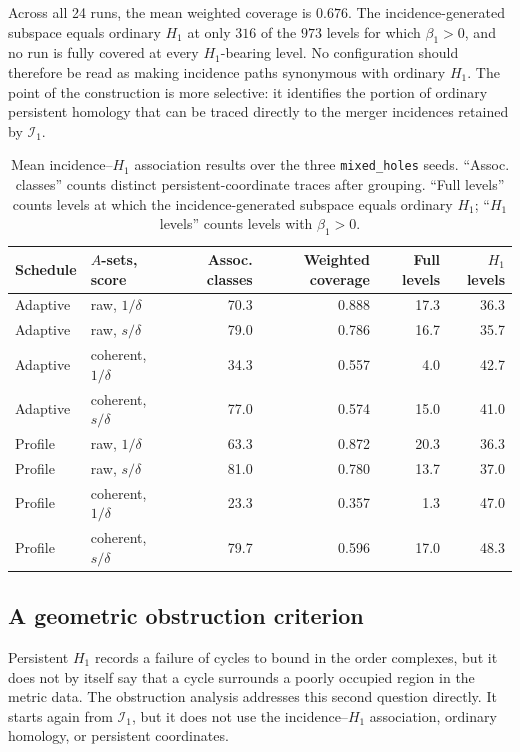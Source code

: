 \documentclass[a4paper,11pt]{article}
\theoremstyle{definition}
\theoremstyle{remark}
\begin{document}
Across all 24 runs, the mean weighted coverage is $0.676$. The incidence-generated subspace equals ordinary $H_1$ at only $316$ of the $973$ levels for which $\beta_1>0$, and no run is fully covered at every $H_1$-bearing level. No configuration should therefore be read as making incidence paths synonymous with ordinary $H_1$. The point of the construction is more selective: it identifies the portion of ordinary persistent homology that can be traced directly to the merger incidences retained by $\mathcal I_1$.

\begin{table}[!ht]
\centering
\caption{Mean incidence--$H_1$ association results over the three \texttt{mixed\_holes} seeds. ``Assoc. classes'' counts distinct persistent-coordinate traces after grouping.  ``Full levels'' counts levels at which the incidence-generated subspace equals ordinary $H_1$; ``$H_1$ levels'' counts levels with $\beta_1>0$.}
\label{tab:mixed-holes-h1-association}
\begin{tabular}{llrrrr}
\toprule
Schedule & $A$-sets, score & Assoc. classes & Weighted coverage & Full levels & $H_1$ levels\\
\midrule
Adaptive & raw, $1/\delta$ & 70.3 & 0.888 & 17.3 & 36.3\\
Adaptive & raw, $s/\delta$ & 79.0 & 0.786 & 16.7 & 35.7\\
Adaptive & coherent, $1/\delta$ & 34.3 & 0.557 & 4.0 & 42.7\\
Adaptive & coherent, $s/\delta$ & 77.0 & 0.574 & 15.0 & 41.0\\
Profile & raw, $1/\delta$ & 63.3 & 0.872 & 20.3 & 36.3\\
Profile & raw, $s/\delta$ & 81.0 & 0.780 & 13.7 & 37.0\\
Profile & coherent, $1/\delta$ & 23.3 & 0.357 & 1.3 & 47.0\\
Profile & coherent, $s/\delta$ & 79.7 & 0.596 & 17.0 & 48.3\\
\bottomrule
\end{tabular}
\end{table}

\subsection{A geometric obstruction criterion}
\label{subsec:geometric-obstruction-criterion}

Persistent $H_1$ records a failure of cycles to bound in the order complexes, but it does not by itself say that a cycle surrounds a poorly occupied region in the metric data. The obstruction analysis addresses this second question directly. It starts again from $\mathcal I_1$, but it does not use the incidence--$H_1$ association, ordinary homology, or persistent coordinates.
\end{document}
